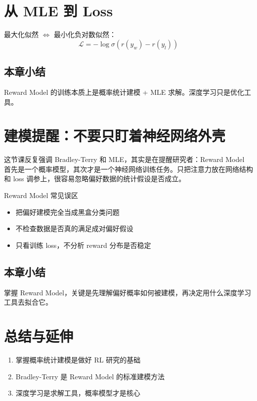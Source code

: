 \documentclass[a4paper]{article}
\begin{document}
\section{从 MLE 到 Loss}
最大化似然 $\Leftrightarrow$ 最小化负对数似然：
$$\mathcal{L} = -\log \sigma(r(y_w) - r(y_l))$$

\subsection{本章小结}
Reward Model 的训练本质上是概率统计建模 + MLE 求解。深度学习只是优化工具。

\newpage
\section{建模提醒：不要只盯着神经网络外壳}
这节课反复强调 Bradley-Terry 和 MLE，其实是在提醒研究者：Reward Model 首先是一个概率模型，其次才是一个神经网络训练任务。只把注意力放在网络结构和 loss 调参上，很容易忽略偏好数据的统计假设是否成立。

\begin{warningbox}{Reward Model 常见误区}
\begin{itemize}
  \item 把偏好建模完全当成黑盒分类问题
  \item 不检查数据是否真的满足成对偏好假设
  \item 只看训练 loss，不分析 reward 分布是否稳定
\end{itemize}
\end{warningbox}

\subsection{本章小结}
掌握 Reward Model，关键是先理解偏好概率如何被建模，再决定用什么深度学习工具去拟合它。

\newpage
\section{总结与延伸}
\begin{enumerate}
  \item 掌握概率统计建模是做好 RL 研究的基础
  \item Bradley-Terry 是 Reward Model 的标准建模方法
  \item 深度学习是求解工具，概率模型才是核心
\end{enumerate}
\end{document}
